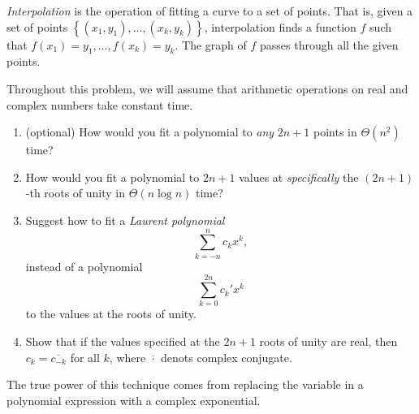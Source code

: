 \documentclass{article}
\begin{document}

\begin{question}
\emph{Interpolation} is the operation of fitting a curve to a set of points. That is, given a set of points $\left\{(x_1, y_1), \dots, (x_k, y_k)\right\}$, interpolation finds a function $f$ such that $f(x_1) = y_1, \dots, f(x_k) = y_k$. The graph of $f$ passes through all the given points.

Throughout this problem, we will assume that arithmetic operations on real and complex numbers take constant time.

\begin{enumerate}[label=(\alph*)]
    \item (optional) How would you fit a polynomial to \emph{any} $2n+1$ points in $\Theta(n^2)$ time?

    \item How would you fit a polynomial to $2n+1$ values at \emph{specifically} the $(2n+1)$-th roots of unity in $\Theta(n \log n)$ time?

    \item Suggest how to fit a \emph{Laurent polynomial} \[ \sum_{k=-n}^n c_k x^k, \] instead of a polynomial \[ \sum_{k=0}^{2n} c_k' x^k \] to the values at the roots of unity.
    
    \item Show that if the values specified at the $2n+1$ roots of unity are real, then $c_k = \overline{c_{-k}}$ for all $k$, where $\overline{\cdot}$ denots complex conjugate.
\end{enumerate}

The true power of this technique comes from replacing the variable in a polynomial expression with a complex exponential.


\end{question}
\end{document}

